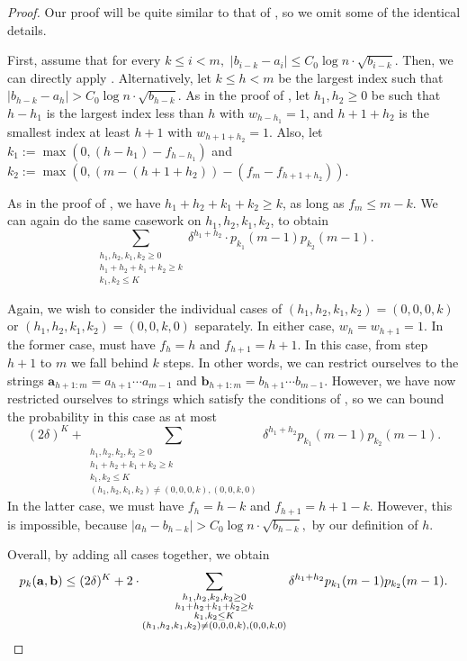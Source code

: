 \documentclass[12pt]{article}
\theoremstyle{definition}
\theoremstyle{remark}
\newcommand{\ba}{\mathbf a}
\newcommand{\bb}{\mathbf b}
\begin{document}
\begin{proof}
    Our proof will be quite similar to that of , so we omit some of the identical details.
    
    First, assume that for every $k \le i < m,$ $|b_{i-k}-a_{i}| \le C_0 \log n \cdot \sqrt{b_{i-k}}$. Then, we can directly apply . Alternatively, let $k \le h < m$ be the largest index such that $|b_{h-k}-a_{h}| > C_0 \log n \cdot \sqrt{b_{h-k}}$. 
    As in the proof of , let $h_1, h_2 \ge 0$ be such that $h-h_1$ is the largest index less than $h$ with $w_{h-h_1} = 1$, and $h+1+h_2$ is the smallest index at least $h+1$ with $w_{h+1+h_2} = 1$. Also, let $k_1 := \max(0, (h-h_1) - f_{h-h_1})$ and $k_2 := \max(0, (m-(h+1+h_2)) - (f_m-f_{h+1+h_2}))$.
    
    As in the proof of , we have $h_1+h_2+k_1+k_2 \ge k$, as long as $f_m \le m-k$. We can again do the same casework on $h_1, h_2, k_1, k_2$, to obtain
\[\sum_{\substack{h_1, h_2, k_1, k_2 \ge 0 \\ h_1+h_2+k_1+k_2 \ge k \\ k_1, k_2 \le K}} \delta^{h_1+h_2} \cdot p_{k_1}(m-1) p_{k_2}(m-1).\]

    Again, we wish to consider the individual cases of $(h_1, h_2, k_1, k_2) = (0, 0, 0, k)$ or $(h_1, h_2, k_1, k_2) = (0, 0, k, 0)$ separately. In either case, $w_h = w_{h+1} = 1$. In the former case, must have $f_h = h$ and $f_{h+1} = h+1$. In this case, from step $h+1$ to $m$ we fall behind $k$ steps. In other words, we can restrict ourselves to the strings $\ba_{h+1:m} = a_{h+1} \cdots a_{m-1}$ and $\bb_{h+1:m} = b_{h+1} \cdots b_{m-1}$. However, we have now restricted ourselves to strings which satisfy the conditions of , so we can bound the probability in this case as at most
\[(2\delta)^{K} + \sum_{\substack{h_1, h_2, k_2, k_2 \ge 0 \\ h_1+h_2+k_1+k_2 \ge k \\ k_1, k_2 \le K \\ (h_1, h_2, k_1, k_2) \neq (0, 0, 0, k), (0, 0, k, 0)}} \delta^{h_1+h_2} p_{k_1}(m-1) p_{k_2}(m-1).\]
    In the latter case, we must have $f_h = h-k$ and $f_{h+1} = h+1-k$. However, this is impossible, because $|a_h-b_{h-k}| > C_0 \log n \cdot \sqrt{b_{h-k}},$ by our definition of $h$.

    Overall, by adding all cases together, we obtain
\[p_k(\ba, \bb) \le (2\delta)^{K} + 2 \cdot \sum_{\substack{h_1, h_2, k_2, k_2 \ge 0 \\ h_1+h_2+k_1+k_2 \ge k \\ k_1, k_2 \le K \\ (h_1, h_2, k_1, k_2) \neq (0, 0, 0, k), (0, 0, k, 0)}} \delta^{h_1+h_2} p_{k_1}(m-1) p_{k_2}(m-1). \qedhere\]
\end{proof}
\end{document}
